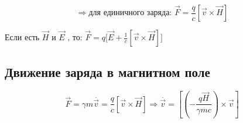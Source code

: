 \[
\Rightarrow\text{для единичного заряда: }\vec{F}=\frac{q}{c}[\vec{v}\times \vec{H}] 
\]

Если есть $\vec{H}\text{ и }\vec{E}\text{ , то: }\boxed{\vec{F}=q \bigg[\vec{E}+\frac{1}{c}[\vec{v} \times \vec{H}]\bigg] }$

\newpage

\subsection*{Движение заряда в магнитном поле}


\[
\vec{F}=\gamma m\overset{.}{\vec{v}}=\frac{q}{c}[\vec{v}\times \vec{H}] \Rightarrow \overset{.}{\vec{v}}=\left[ \left( -\frac{q\vec{H}}{\gamma mc}  \right) \times \vec{v} \right]
\]
